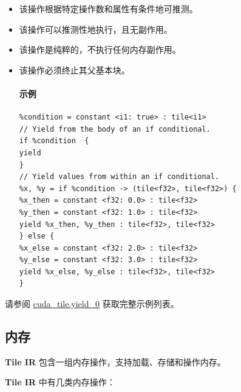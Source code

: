 \documentclass{article}
\begin{document}
\begin{itemize}
\item 该操作根据特定操作数和属性有条件地可推测。
\item 该操作可以推测性地执行，且无副作用。
\item 该操作是纯粹的，不执行任何内存副作用。
\item 该操作必须终止其父基本块。


\paragraph{示例}

\begin{lstlisting}
%condition = constant <i1: true> : tile<i1>
// Yield from the body of an if conditional.
if %condition  {
yield
}
// Yield values from within an if conditional.
%x, %y = if %condition -> (tile<f32>, tile<f32>) {
%x_then = constant <f32: 0.0> : tile<f32>
%y_then = constant <f32: 1.0> : tile<f32>
yield %x_then, %y_then : tile<f32>, tile<f32>
} else {
%x_else = constant <f32: 2.0> : tile<f32>
%y_else = constant <f32: 3.0> : tile<f32>
yield %x_else, %y_else : tile<f32>, tile<f32>
}
\end{lstlisting}

\end{itemize}
请参阅 \href{https://docs.nvidia.com/cuda/tile-ir/latest/sections/appendix.html#example-cuda-tile-yield-0}{cuda\_tile.yield\_0} 获取完整示例列表。




\subsection{内存}

\textbf{Tile IR} 包含一组内存操作，支持加载、存储和操作内存。


\textbf{Tile IR} 中有几类内存操作：
\end{document}
